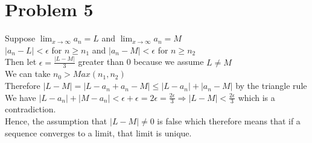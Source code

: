 \documentclass{article}
\begin{document}
\section*{Problem 5}
Suppose $\lim_{x \to \infty} a_n = L$ and $\lim_{x \to \infty} a_n = M$
\\$|a_n - L| < \epsilon$ for $n \geq n_1$ and $|a_n - M| < \epsilon$ for $n \geq n_2$
\\Then let $\epsilon = \frac{|L - M|}{3}$  greater than 0 because we assume $L \neq M$
\\We can take $n_0 > Max(n_1, n_2)$
\\Therefore $|L - M| = |L - a_n + a_n - M| \leq |L - a_n| + |a_n - M|$ by the triangle rule
\\We have $|L - a_n| + |M - a_n| < \epsilon + \epsilon = 2\epsilon = \frac{2\epsilon}{3} \Rightarrow |L-M| < \frac{2\epsilon}{3}$ which is a contradiction.
\\Hence, the assumption that $|L - M| \neq 0$ is false which therefore means that if a sequence converges to a limit, that limit is unique.
\end{document}
